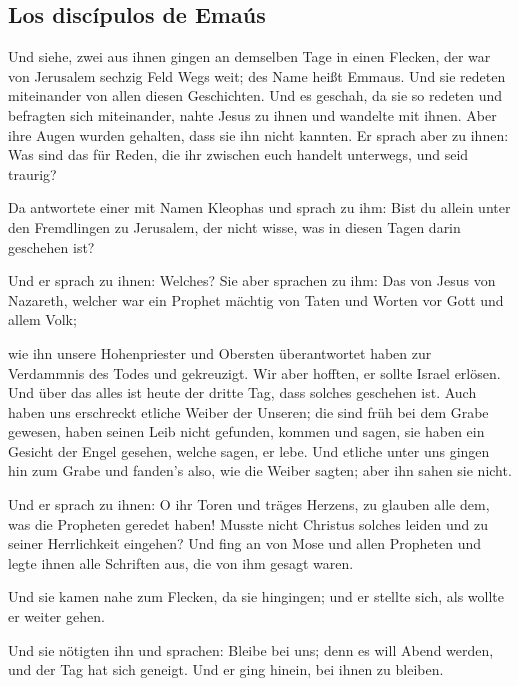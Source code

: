 \hypertarget{los-discuxedpulos-de-emauxfas}{%
\subsection{Los discípulos de
Emaús}\label{los-discuxedpulos-de-emauxfas}}

 Und siehe, zwei aus ihnen gingen an demselben Tage in
einen Flecken, der war von Jerusalem sechzig Feld Wegs weit; des Name
heißt Emmaus.  Und sie redeten miteinander von allen
diesen Geschichten.  Und es geschah, da sie so redeten
und befragten sich miteinander, nahte Jesus zu ihnen und wandelte mit
ihnen.  Aber ihre Augen wurden gehalten, dass sie ihn
nicht kannten.  Er sprach aber zu ihnen: Was sind das für
Reden, die ihr zwischen euch handelt unterwegs, und seid traurig?

 Da antwortete einer mit Namen Kleophas und sprach zu
ihm: Bist du allein unter den Fremdlingen zu Jerusalem, der nicht wisse,
was in diesen Tagen darin geschehen ist?

 Und er sprach zu ihnen: Welches? Sie aber sprachen zu
ihm: Das von Jesus von Nazareth, welcher war ein Prophet mächtig von
Taten und Worten vor Gott und allem Volk;

 wie ihn unsere Hohenpriester und Obersten überantwortet
haben zur Verdammnis des Todes und gekreuzigt.  Wir aber
hofften, er sollte Israel erlösen. Und über das alles ist heute der
dritte Tag, dass solches geschehen ist.  Auch haben uns
erschreckt etliche Weiber der Unseren; die sind früh bei dem Grabe
gewesen,  haben seinen Leib nicht gefunden, kommen und
sagen, sie haben ein Gesicht der Engel gesehen, welche sagen, er lebe.
 Und etliche unter uns gingen hin zum Grabe und fanden's
also, wie die Weiber sagten; aber ihn sahen sie nicht.

 Und er sprach zu ihnen: O ihr Toren und träges Herzens,
zu glauben alle dem, was die Propheten geredet haben! 
Musste nicht Christus solches leiden und zu seiner Herrlichkeit
eingehen?  Und fing an von Mose und allen Propheten und
legte ihnen alle Schriften aus, die von ihm gesagt waren.

 Und sie kamen nahe zum Flecken, da sie hingingen; und er
stellte sich, als wollte er weiter gehen.

 Und sie nötigten ihn und sprachen: Bleibe bei uns; denn
es will Abend werden, und der Tag hat sich geneigt. Und er ging hinein,
bei ihnen zu bleiben.

